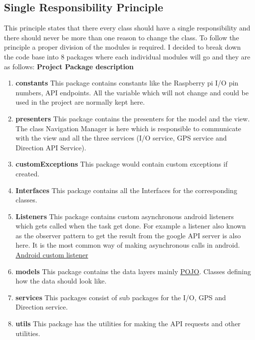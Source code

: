 \subsection{Single Responsibility Principle}
    
    This principle states that there every class should have a single responsibility
    and there should never be more than one reason to change the class. To
    follow the principle a proper division of the modules is required. 
    I decided to break down the code base into 8 packages where each 
    individual modules will go and they are as follows:
    \newpage
    \textbf{Project Package description}
    \begin{enumerate}
        \item 
            \textbf{constants} 
                This package contains constants like the Raspberry pi I/O pin 
                numbers, API endpoints. All the variable which will not 
                change and could be used in the project are normally kept here.
        \item 
            \textbf{presenters} 
                This package contains the presenters for the model and the view.
                The class Navigation Manager is here which is responsible to communicate
                with the view and all the three services (I/O service, GPS service and 
                Direction API Service).  
        \item 
            \textbf{customExceptions}
                This package would contain custom exceptions if created.
        \item 
            \textbf{Interfaces}
                This package contains all the Interfaces for the corresponding classes. 
        \item 
            \textbf{Listeners}
                This package contains custom asynchronous android listeners which gets 
                called when the task get done. For example a listener also known as the
                observer pattern \cite{Hotop2015} to get the result
                from the google API server is also here. It is the most common way of
                making asynchronous calls in android. 
                \href{https://guides.codepath.com/android/Creating-Custom-Listeners}
                {Android custom listener}
        \item 
            \textbf{models}
            This package contains the data layers mainly 
            \href{https://spring.io/understanding/POJO}  {POJO}. Classes defining how the
            data should look like.
        \item 
            \textbf{services} 
                This packages consist of sub packages for the I/O, GPS and Direction service.
        \item 
            \textbf{utils}
                This package has the utilities for making the API requests and other utilities. 
    \end{enumerate}

